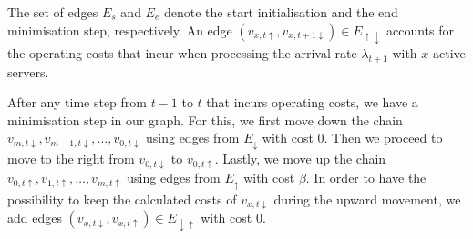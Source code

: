 \documentclass[hidelinks]{article}
\theoremstyle{plain}
\theoremstyle{definition}
\theoremstyle{rem}
\begin{document}
The set of edges $E_s$ and $E_e$ denote the start initialisation and the end minimisation step, respectively. An edge $(v_{x,t\uparrow},v_{x,t+1\downarrow})\in E_{\uparrow\downarrow}$ accounts for the operating costs that incur when processing the arrival rate $\lambda_{t+1}$ with $x$ active servers.

After any time step from $t-1$ to $t$ that incurs operating costs, we have a minimisation step in our graph. For this, we first move down the chain $v_{m,t\downarrow},v_{m-1,t\downarrow},\ldots,v_{0,t\downarrow}$ using edges from $E_\downarrow$ with cost $0$. Then we proceed to move to the right from $v_{0,t\downarrow}$ to $v_{0,t\uparrow}$. Lastly, we move up the chain $v_{0,t\uparrow},v_{1,t\uparrow},\ldots,v_{m,t\uparrow}$ using edges from $E_\uparrow$ with cost $\beta$. In order to have the possibility to keep the calculated costs of $v_{x,t\downarrow}$ during the upward movement, we add edges $(v_{x,t\downarrow},v_{x,t\uparrow})\in E_{\downarrow\uparrow}$ with cost $0$.
\end{document}
